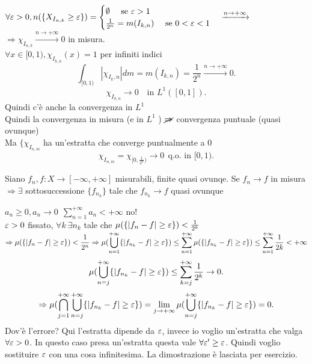 \documentclass[12px]{article}
\begin{document}
		 $\forall \varepsilon > 0, n(\{X_{I_{n,k}}\geq \varepsilon\}) = \begin{cases}
				 \emptyset\ \ \ \text{ se } \varepsilon > 1\\
				 \frac 1 {2^n} = m(I_{k,n})\ \  \ \text{ se } 0 < \varepsilon < 1
			 \end{cases} \xrightarrow{ n \rightarrow +\infty}$\\
			 $ \Rightarrow  \chi_{I_{n,k}} \xrightarrow{ n \rightarrow +\infty} 0$ in misura.\\
		 $\forall x\in [0,1), \chi_{I_{k,n}}(x) = 1$ per infiniti indici \\
		 \[
			 \int_{[0,1)}|\chi_{I_k,n}|dm = m(I_{k,n}) = \frac {1}{2^n} \xrightarrow{ n \rightarrow +\infty} 0

			 
		 .\] 
		 \[
			 \chi_{I_{k,n}} \rightarrow 0 \ \ \ \text{ in } L^1([0,1])
		 .\] 
	Quindi c'è anche la convergenza in $L^1$\\
	Quindi la convergenza in misura (e in  $L^1$ ) $\cancel{ \Rightarrow  }$ convergenza puntuale (quasi ovunque)\\
	Ma $\{\chi_{I_{n,m}}$ ha un'estratta che converge puntualmente a  $0$
		 \[
			 \chi_{I_{n,m}} = \chi_{[0,\frac{1}{2^n})} \rightarrow 0 \ \ \text{q.o. in } [0,1)
		.\] 
		\begin{teo}
			Siano $f_n, f: X \rightarrow [-\infty, +\infty]$ misurabili, finite quasi ovunqe. Se $f_n \rightarrow f$ in misura $ \Rightarrow  \exists $ sottosuccessione $\{f_{n_k}\}$ tale che  $f_{n_k} \rightarrow f$ quasi ovunque
		\end{teo}
		\begin{dimo}[Errata]
			$a_n\geq 0, a_n \rightarrow 0\ \ \sum^{+\infty}_{n =1}a_n < +\infty$ no!\\
			$\varepsilon > 0 $ fissato, $\forall k \ \exists n_k$ tale che  $\mu(\{|f_n-f|\geq \varepsilon\})< \frac{1}{2^k}$\\
			$\displaystyle \Rightarrow  \mu(\{|f_n-f|\geq \varepsilon\}) < \frac 1 {2^n} \Rightarrow  \mu( \bigcup^{+\infty}_{n = 1}\{|f_{n_k}-f|\geq\varepsilon\})\leq \sum^{+\infty}_{n=1}\mu(\{|f_{n_k}-f|\geq\varepsilon\})\leq \sum^{+\infty}_{n=1}\frac{1}{2k} < + \infty$ \\
			\[
				\mu( \bigcup^{+\infty}_{n =j }\{|f_{n_k}-f|\geq \varepsilon\})\leq \sum^{+\infty}_{k=j}\frac{1}{2^k} \rightarrow 0
			.\] 
			\[
				\Rightarrow \mu( \bigcap^{+\infty}_{j = 1} \bigcup^{+\infty}_{n = j}\{|f_{n_k}-f|\geq \varepsilon\}) = \lim_{j \rightarrow +\infty}\mu( \bigcup^{+\infty}_{n = j}\{|f_{n_k}-f|\geq\varepsilon\}) =0 
			.\] 
			Dov'è l'errore? Qui l'estratta dipende da $\varepsilon$, invece io voglio un'estratta che valga $\forall \varepsilon > 0$. In questo caso presa un'estratta questa vale  $\forall \varepsilon'\geq \varepsilon$. Quindi voglio sostituire  $\varepsilon$ con una cosa infinitesima. La dimostrazione è lasciata per esercizio.
	\end{dimo}
\end{document}
